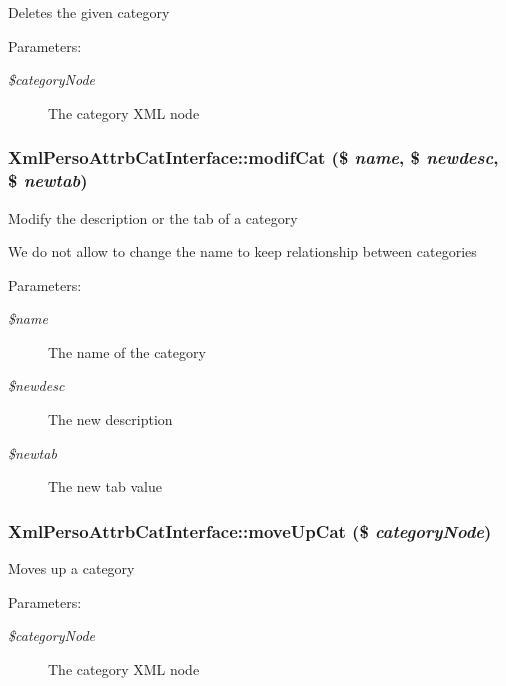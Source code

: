 Deletes the given category

\begin{Desc}
\item[Parameters:]
\begin{description}
\item[{\em \$categoryNode}]The category XML node \end{description}
\end{Desc}
\subsubsection{\setlength{\rightskip}{0pt plus 5cm}XmlPersoAttrbCatInterface::modifCat (\$ {\em name}, \$ {\em newdesc}, \$ {\em newtab})}\label{classXmlPersoAttrbCatInterface_ed34908157fcc523b76c6824b770c3a6}


Modify the description or the tab of a category

We do not allow to change the name to keep relationship between categories

\begin{Desc}
\item[Parameters:]
\begin{description}
\item[{\em \$name}]The name of the category \item[{\em \$newdesc}]The new description \item[{\em \$newtab}]The new tab value \end{description}
\end{Desc}
\subsubsection{\setlength{\rightskip}{0pt plus 5cm}XmlPersoAttrbCatInterface::moveUpCat (\$ {\em categoryNode})}\label{classXmlPersoAttrbCatInterface_908233b7081903cbf4e06f265c546f40}


Moves up a category

\begin{Desc}
\item[Parameters:]
\begin{description}
\item[{\em \$categoryNode}]The category XML node \end{description}
\end{Desc}

